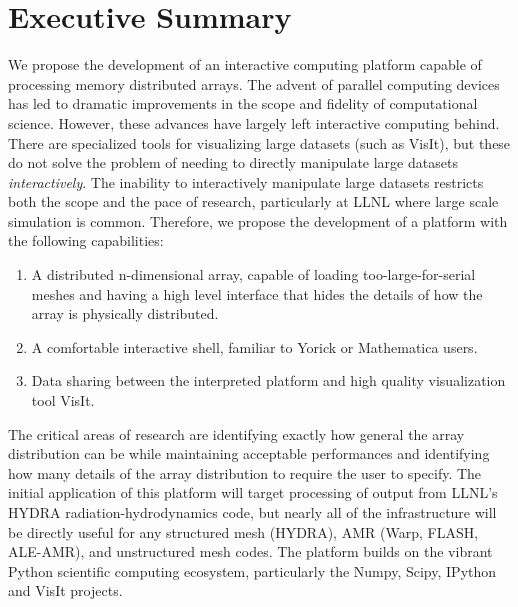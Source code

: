 \documentclass[letterpaper,11pt]{article}
\begin{document}

\setlength{\parindent}{15pt}
\section*{Executive Summary }
We propose the development of an interactive computing platform capable of processing memory distributed arrays.  The advent of parallel computing devices has led to dramatic improvements in the scope and fidelity of computational science.  However, these advances have largely left interactive computing behind.  There are specialized tools for visualizing large datasets (such as VisIt\cite{VisIt}), but these do not solve the problem of needing to directly manipulate large datasets \emph{interactively}.  The inability to interactively manipulate large datasets restricts both the scope and the pace of research, particularly at LLNL where large scale simulation is common.  Therefore, we propose the development of a platform with the following capabilities:

\begin{enumerate}
	\item A distributed n-dimensional array, capable of loading too-large-for-serial meshes and having a high level interface that hides the details of how the array is physically distributed.

	\item A comfortable interactive shell, familiar to Yorick or Mathematica users.

	\item Data sharing between the interpreted platform and high quality visualization tool VisIt.
\end{enumerate}

The critical areas of research are identifying exactly how general the array distribution can be while maintaining acceptable performances and identifying how many details of the array distribution to require the user to specify.  The initial application of this platform will target processing of output from LLNL's HYDRA\cite{Marinak2001} radiation-hydrodynamics code, but nearly all of the infrastructure will be directly useful for any structured mesh (HYDRA), AMR (Warp\cite{Grote2005}, FLASH\cite{flash}, ALE-AMR\cite{Koniges2010}), and unstructured mesh codes.  The platform builds on the vibrant Python scientific computing ecosystem, particularly the Numpy\cite{Oliphant2006}, Scipy\cite{numpyscipy}, IPython\cite{ipython} and VisIt projects.
\end{document}
